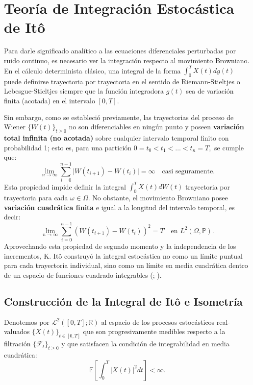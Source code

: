 \documentclass[
  spanish,
  us-letterpaper,
]{scrreprt}
\numberwithin{equation}{section}
\theoremstyle{plain}
\theoremstyle{plain}
\theoremstyle{definition}
\theoremstyle{plain}
\theoremstyle{remark}
\begin{document}
\section{Teoría de Integración Estocástica de
Itô}\label{teoruxeda-de-integraciuxf3n-estocuxe1stica-de-ituxf4}

Para darle significado analítico a las ecuaciones diferenciales
perturbadas por ruido continuo, es necesario ver la integración respecto
al movimiento Browniano. En el cálculo determinista clásico, una
integral de la forma \(\displaystyle \int_0^T X(t) dg(t)\) puede
definirse trayectoria por trayectoria en el sentido de Riemann-Stieltjes
o Lebesgue-Stieltjes siempre que la función integradora \(g(t)\) sea de
variación finita (acotada) en el intervalo \([0, T]\).

Sin embargo, como se estableció previamente, las trayectorias del
proceso de Wiener \(\{W(t)\}_{t \ge 0}\) no son diferenciables en ningún
punto y poseen \textbf{variación total infinita (no acotada)} sobre
cualquier intervalo temporal finito con probabilidad 1; esto es, para
una partición \(0 = t_0 < t_1 < \dots < t_n = T,\) se cumple que: \[
\lim_{n \to \infty} \sum_{i=0}^{n-1} \vert W(t_{i+1}) - W(t_i) \vert = \infty \quad \text{casi seguramente.}
\] Esta propiedad impide definir la integral
\(\displaystyle \int_0^T X(t) dW(t)\) trayectoria por trayectoria para
cada \(\omega \in \Omega\). No obstante, el movimiento Browniano posee
\textbf{variación cuadrática finita} e igual a la longitud del intervalo
temporal, es decir: \[
\lim_{n \to \infty} \sum_{i=0}^{n-1} \left( W(t_{i+1}) - W(t_i) \right)^2 = T \quad \text{en } L^2(\Omega, \mathbb{P}).
\] Aprovechando esta propiedad de segundo momento y la independencia de
los incrementos, K. Itô construyó la integral estocástica no como un
límite puntual para cada trayectoria individual, sino como un límite en
media cuadrática dentro de un espacio de funciones cuadrado-integrables
(;
).

\subsection{Construcción de la Integral de Itô e
Isometría}\label{construcciuxf3n-de-la-integral-de-ituxf4-e-isometruxeda}

Denotemos por \(\mathcal{L}^2([0, T]; \mathbb{R})\) al espacio de los
procesos estocásticos real-valuados \(\{X(t)\}_{t \in [0, T]}\) que son
progresivamente medibles respecto a la filtración
\(\{\mathcal{F}_t\}_{t \ge 0}\) y que satisfacen la condición de
integrabilidad en media cuadrática: \[
\mathbb{E}\left[\int_0^T \vert X(t) \vert^2 dt\right] < \infty.
\]
\end{document}
